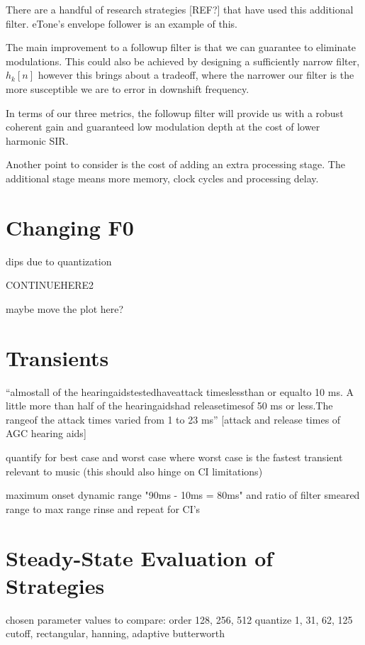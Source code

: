 \documentclass [11pt, proquest] {uwthesis}[2015/03/03]
\begin{document}
There are a handful of research strategies [REF?] that have used this additional filter.  eTone's envelope follower is an example of this.

The main improvement to a followup filter is that we can guarantee to eliminate modulations.  This could also be achieved by designing a sufficiently narrow filter, $h_k[n]$ however this brings about a tradeoff, where the narrower our filter is the more susceptible we are to error in downshift frequency.

In terms of our three metrics, the followup filter will provide us with a robust coherent gain and guaranteed low modulation depth at the cost of lower harmonic SIR.

Another point to consider is the cost of adding an extra processing stage.  The additional stage means more memory, clock cycles and processing delay.


\section{Changing F0}

dips due to quantization

CONTINUEHERE2

maybe move the plot here?


\section{Transients}

``almostall of the hearingaidstestedhaveattack timeslessthan or equalto 10 ms. A little more than half of the hearingaidshad releasetimesof 50 ms or less.The rangeof the attack times varied from 1 to 23 ms'' [attack and release times of AGC hearing aids]

quantify for best case and worst case where worst case is the fastest transient relevant to music (this should also hinge on CI limitations)

maximum onset dynamic range "90ms - 10ms = 80ms"
and ratio of filter smeared range to max range
rinse and repeat for CI's

\section{Steady-State Evaluation of Strategies}

chosen parameter values to compare:
order 128, 256, 512
quantize 1, 31, 62, 125
cutoff, rectangular, hanning, adaptive butterworth
\end{document}
